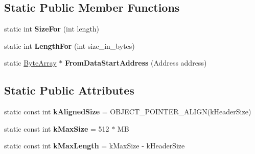 \subsection*{Static Public Member Functions}
\begin{DoxyCompactItemize}
\item 
static int {\bfseries Size\+For} (int length)\hypertarget{classv8_1_1internal_1_1_byte_array_a0b2f58c92d17d1f72c82bf1116f79c62}{}\label{classv8_1_1internal_1_1_byte_array_a0b2f58c92d17d1f72c82bf1116f79c62}

\item 
static int {\bfseries Length\+For} (int size\+\_\+in\+\_\+bytes)\hypertarget{classv8_1_1internal_1_1_byte_array_a59dfeddc28a37ee47271562bdfa3f97b}{}\label{classv8_1_1internal_1_1_byte_array_a59dfeddc28a37ee47271562bdfa3f97b}

\item 
static \hyperlink{classv8_1_1internal_1_1_byte_array}{Byte\+Array} $\ast$ {\bfseries From\+Data\+Start\+Address} (Address address)\hypertarget{classv8_1_1internal_1_1_byte_array_a9397eff4c1809d93e046473f57a30adc}{}\label{classv8_1_1internal_1_1_byte_array_a9397eff4c1809d93e046473f57a30adc}

\end{DoxyCompactItemize}
\subsection*{Static Public Attributes}
\begin{DoxyCompactItemize}
\item 
static const int {\bfseries k\+Aligned\+Size} = O\+B\+J\+E\+C\+T\+\_\+\+P\+O\+I\+N\+T\+E\+R\+\_\+\+A\+L\+I\+GN(k\+Header\+Size)\hypertarget{classv8_1_1internal_1_1_byte_array_a2eff4f9abade4d922dd6f82df8c24387}{}\label{classv8_1_1internal_1_1_byte_array_a2eff4f9abade4d922dd6f82df8c24387}

\item 
static const int {\bfseries k\+Max\+Size} = 512 $\ast$ MB\hypertarget{classv8_1_1internal_1_1_byte_array_a3efea1a92b13163d8948ff121732b8ad}{}\label{classv8_1_1internal_1_1_byte_array_a3efea1a92b13163d8948ff121732b8ad}

\item 
static const int {\bfseries k\+Max\+Length} = k\+Max\+Size -\/ k\+Header\+Size\hypertarget{classv8_1_1internal_1_1_byte_array_abb6e4506197d4155b8c9509fd49f13cb}{}\label{classv8_1_1internal_1_1_byte_array_abb6e4506197d4155b8c9509fd49f13cb}

\end{DoxyCompactItemize}

